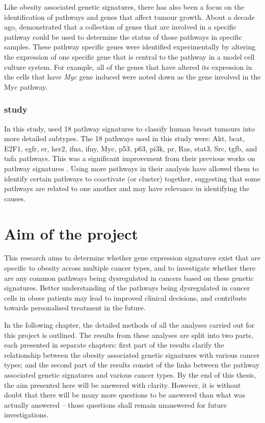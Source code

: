 Like obesity associated genetic signatures, there has also been a focus on the identification of pathways and genes that affect tumour growth.
About a decade ago, \citet{Bild2006} demonstrated that a collection of genes that are involved in a specific pathway could be used to determine the status of those pathways in specific samples.
These pathway specific genes were identified experimentally by altering the expression of one specific gene that is central to the pathway in a model cell culture system.
For example, all of the genes that have altered its expression in the cells that have \textit{Myc} gene induced were noted down as the gene involved in the Myc pathway.

\subsubsection{\citet{Gatza2010a} study}
\label{ssub:gatza_study}

In this study, \citet{Gatza2010a} used 18 pathway signatures to classify human breast tumours into more detailed subtypes.
The 18 pathways used in this study were: Akt, \gls{bcat}, E2F1, \gls{egfr}, \gls{er}, \gls{her2}, \gls{ifna}, \gls{ifny}, Myc, p53, p63, \gls{pi3k}, \gls{pr}, Ras, \gls{stat3}, Src, \gls{tgfb}, and \gls{tnfa} pathways.
This was a significant improvement from their previous works on pathway signatures \citep{Bild2006,Bild2009}.
Using more pathways in their analysis have allowed them to identify certain pathways to coactivate (or cluster) together, suggesting that some pathways are related to one another and may have relevance in identifying the causes.

\section{Aim of the project}
\label{sec:aim}

This research aims to determine whether gene expression signatures exist  that are specific to obesity across multiple cancer types, and to investigate whether there are any common pathways being dysregulated in cancers based on these genetic signatures.
Better understanding of the pathways being dysregulated in cancer cells in obese patients may lead to improved clinical decisions, and contribute towards personalised treatment in the future.

In the following chapter, the detailed methods of all the analyses carried out for this project is outlined.
The results from these analyses are split into two parts, each presented in separate chapters: first part of the results clarify the relationship between the obesity associated genetic signatures with various cancer types; and the second part of the results consist of the links between the pathway associated genetic signatures and various cancer types.
By the end of this thesis, the aim presented here will be answered with clarity.
However, it is without doubt that there will be many more questions to be answered than what was actually answered -- those questions shall remain unanswered for future investigations.


